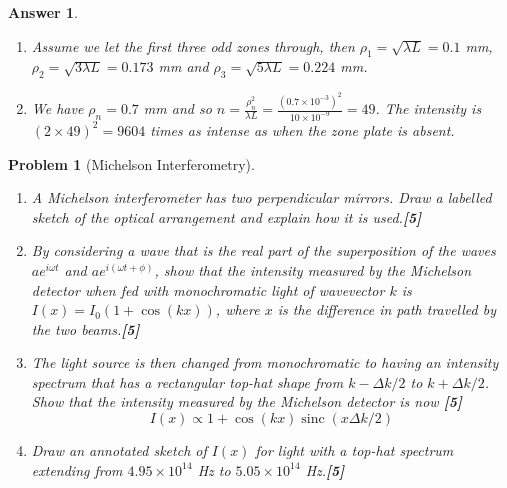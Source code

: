 \documentclass[a4paper]{article}
\DeclareMathOperator{\sinc}{sinc}
\newtheorem{ans}{Answer}[subsection]
\theoremstyle{new}
\newtheorem{qns}{Problem}[subsection]
\begin{document}
\begin{ans}
\begin{enumerate}[label=(\roman*)]
\item Assume we let the first three odd zones through, then $\rho_1=\sqrt{\lambda L}=0.1$ mm, $\rho_2=\sqrt{3\lambda L}=0.173$ mm and $\rho_3=\sqrt{5\lambda L}=0.224$ mm.
\item We have $\rho_n=0.7$ mm and so $n=\frac{\rho_n^2}{\lambda L}=\frac{(0.7\times10^{-3})^2}{10\times10^{-9}}=49$. The intensity is $(2\times49)^2=9604$ times as intense as when the zone plate is absent.
\end{enumerate}
\end{ans}
\begin{qns}[Michelson Interferometry]\leavevmode
\begin{enumerate}[label=(\roman*)]
\item A Michelson interferometer has two perpendicular mirrors. Draw a labelled sketch of the optical arrangement and explain how it is used.\hfill\textbf{[5]}
\item By considering a wave that is the real part of the superposition of the waves $ae^{i\omega t}$ and $ae^{i(\omega t+\phi)}$, show that the intensity measured by the Michelson detector when fed with monochromatic light of wavevector $k$ is $I(x)=I_0(1+\cos(kx))$, where $x$ is the difference in path travelled by the two beams.\hfill\textbf{[5]}
\item The light source is then changed from monochromatic to having an intensity spectrum that has a rectangular top-hat shape from $k-\Delta k/2$ to $k+\Delta k/2$. Show that the intensity measured by the Michelson detector is now \hfill\textbf{[5]}
$$I(x)\propto 1+\cos(kx)\sinc(x\Delta k/2)$$
\item Draw an annotated sketch of $I(x)$ for light with a top-hat spectrum extending from $4.95\times10^{14}$ Hz to $5.05\times10^{14}$ Hz.\hfill\textbf{[5]}
\end{enumerate}
\end{qns}
\end{document}
